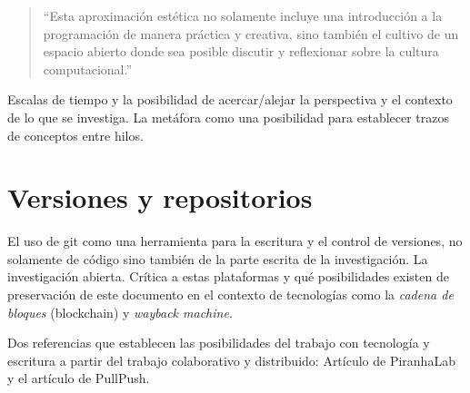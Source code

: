 \begin{quote}
  ``Esta aproximación estética no solamente incluye una introducción a la programación de manera práctica y creativa, sino también el cultivo de un espacio abierto donde sea posible discutir y reflexionar sobre la cultura computacional.''\citep[p.~87]{soonKnotts}

\end{quote}
  

Escalas de tiempo y la posibilidad de acercar/alejar la perspectiva y el contexto de lo que se investiga. La metáfora como una posibilidad para establecer trazos de conceptos entre hilos. 



\section{Versiones y repositorios}

El uso de git como una herramienta para la escritura y el control de versiones, no solamente de código sino también de la parte escrita de la investigación. La investigación abierta. Crítica a estas plataformas y qué posibilidades existen de preservación de este documento en el contexto de tecnologías como la \emph{cadena de bloques} (blockchain) y \emph{wayback machine}. 

Dos referencias que establecen las posibilidades del trabajo con tecnología y escritura a partir del trabajo colaborativo y distribuido: Artículo de PiranhaLab y el artículo de PullPush. 
